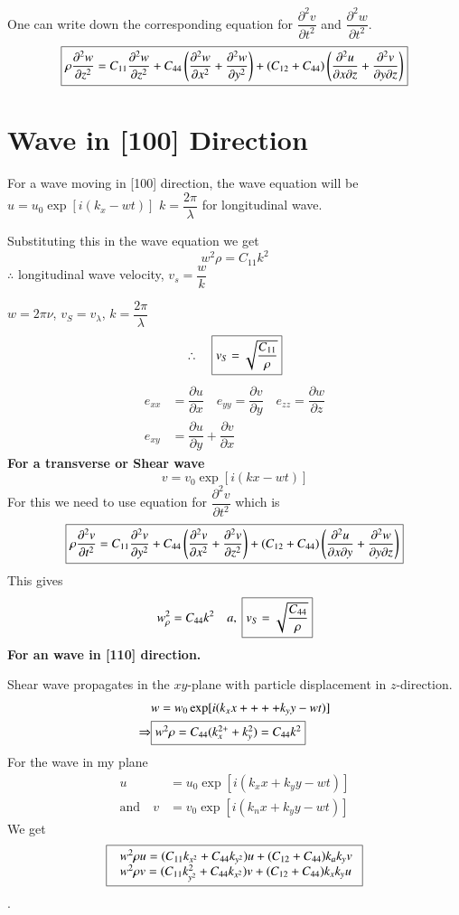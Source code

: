 One can write down the corresponding equation for $\dfrac{\partial^{2}v}{\partial t^{2}}$ and $\dfrac{\partial^{2}w}{\partial t^{2}}$.
$$
\fbox{$\rho \dfrac{\partial^{2}w}{\partial z^{2}}=C_{11}\dfrac{\partial^{2}w}{\partial z^{2}}+C_{44}\left(\dfrac{\partial^{2}w}{\partial x^{2}}+\dfrac{\partial^{2}w}{\partial y^{2}}\right)+(C_{12}+C_{44})\left(\dfrac{\partial^{2}u}{\partial x\partial z}+\dfrac{\partial^{2}v}{\partial y\partial z}\right)$}
$$

\section*{Wave in [100] Direction}

For a wave moving in [100] direction, the wave equation will be $u=u_{0}\exp [i(k_{x}-wt)]$ $k=\dfrac{2\pi}{\lambda}$ for longitudinal wave.

Substituting this in the wave equation we get
$$
w^{2}\rho=C_{11}k^{2}
$$
$\therefore$ longitudinal wave velocity, $v_{s}=\dfrac{w}{k}$

$w=2\pi \nu$, $v_{S}=v_{\lambda}$, $k=\dfrac{2\pi}{\lambda}$
$$
\therefore\quad \fbox{$v_{S}=\sqrt{\dfrac{C_{11}}{\rho}}$}
$$
\begin{align*}
e_{xx} &= \dfrac{\partial u}{\partial x}\quad e_{yy}=\dfrac{\partial v}{\partial y}\quad e_{zz}=\dfrac{\partial w}{\partial z}\\
e_{xy} &= \dfrac{\partial u}{\partial y}+\dfrac{\partial v}{\partial x}\tag{*}
\end{align*}
{\bf For a transverse or Shear wave}
$$
v=v_{0}\exp [i(kx-wt)]
$$
For this we need to use equation for $\dfrac{\partial^{2}v}{\partial t^{2}}$ which is
$$
\fbox{$\rho\dfrac{\partial^{2}v}{\partial t^{2}}=C_{11}\dfrac{\partial^{2}v}{\partial y^{2}}+C_{44}\left(\dfrac{\partial^{2}v}{\partial x^{2}}+\dfrac{\partial^{2}v}{\partial z^{2}}\right)+(C_{12}+C_{44})\left(\dfrac{\partial^{2}u}{\partial x\partial y}+\dfrac{\partial^{2}w}{\partial y\partial z}\right)$}
$$
This gives 
$$
w^{2}_{\rho}=C_{44}k^{2}\quad a, \ \fbox{$v_{S}=\sqrt{\dfrac{C_{44}}{\rho}}$}
$$
{\bf For an wave in [110] direction.}

Shear wave propagates in the $xy$-plane with particle displacement in $z$-direction.
\begin{align*}
& w=w_{0}\exp[i(k_{x}x++++k_{y}y-wt)]\\
\Rightarrow & \fbox{$w^{2}\rho=C_{44}(k^{2+}_{x}+k^{2}_{y})=C_{44}k^{2}$}
\end{align*}
For the wave in my plane
\begin{align*}
u &= u_{0}\exp [i(k_{x}x+k_{y}y-wt)]\\
\text{and}\quad v &= v_{0}\exp [i(k_{n}x+k_{y}y-wt)]
\end{align*}
We get
$$
\fbox{
$
\begin{array}{l}
w^{2}\rho u = (C_{11}k_{x^{2}}+C_{44}k_{y^{2}})u+(C_{12}+C_{44})k_{a}k_{y}v\\
w^{2}\rho v = (C_{11}k^{2}_{y^{2}}+C_{44}k_{x^{2}})v+(C_{12}+C_{44})k_{x}k_{y}u
  \end{array}$}
$$
.

